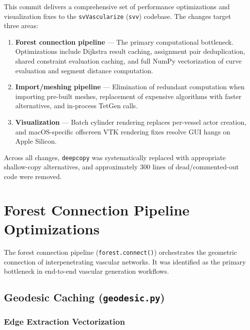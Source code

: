 \documentclass[11pt,a4paper]{article}
\begin{document}
This commit delivers a comprehensive set of performance optimizations and visualization fixes to the \texttt{svVascularize} (\texttt{svv}) codebase. The changes target three areas:

\begin{enumerate}[leftmargin=2em]
    \item \textbf{Forest connection pipeline} --- The primary computational bottleneck. Optimizations include Dijkstra result caching, assignment pair deduplication, shared constraint evaluation caching, and full NumPy vectorization of curve evaluation and segment distance computation.
    \item \textbf{Import/meshing pipeline} --- Elimination of redundant computation when importing pre-built meshes, replacement of expensive algorithms with faster alternatives, and in-process TetGen calls.
    \item \textbf{Visualization} --- Batch cylinder rendering replaces per-vessel actor creation, and macOS-specific offscreen VTK rendering fixes resolve GUI hangs on Apple Silicon.
\end{enumerate}

Across all changes, \texttt{deepcopy} was systematically replaced with appropriate shallow-copy alternatives, and approximately 300 lines of dead/commented-out code were removed.

\section{Forest Connection Pipeline Optimizations}

The forest connection pipeline (\texttt{forest.connect()}) orchestrates the geometric connection of interpenetrating vascular networks. It was identified as the primary bottleneck in end-to-end vascular generation workflows.

\subsection{Geodesic Caching (\texttt{geodesic.py})}

\subsubsection{Edge Extraction Vectorization}
\end{document}
